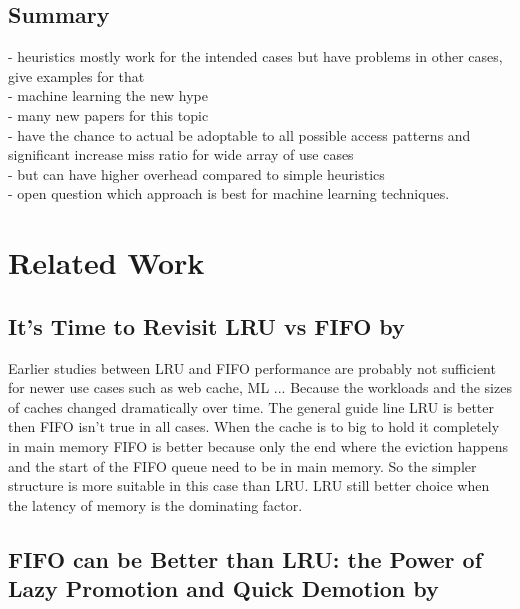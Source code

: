 \documentclass[
	12pt,
	a4paper,
	abstract,
	bibliography=totoc,
	chapterprefix,
	headings=openright,
	numbers=endperiod,
	parskip=half,
	twoside,
]{scrreprt}
\begin{document}
\section{Summary}
\label{sec:summary}

- heuristics mostly work for the intended cases but have problems in other cases, give examples for that\\
- machine learning the new hype\\
- many new papers for this topic \\
- have the chance to actual be adoptable to all possible access patterns and significant increase miss ratio for wide array of use cases \\
- but can have higher overhead compared to simple heuristics\\
- open question which approach is best for machine learning techniques.

\chapter{Related Work}
\label{cha:related work}

\section*{It's Time to Revisit LRU vs FIFO by \cite{eytan2020s}}

Earlier studies between LRU and FIFO performance are probably not sufficient for newer use cases such as web cache, ML ...
Because the workloads and the sizes of caches changed dramatically over time.
The general guide line LRU is better then FIFO isn't true in all cases.
When the cache is to big to hold it completely in main memory FIFO is better because only the end where the eviction happens and the start of the FIFO queue need to be in main memory. So the simpler structure is more suitable in this case than LRU.
LRU still better choice when the latency of memory is the dominating factor.

\section*{FIFO can be Better than LRU: the Power of Lazy Promotion and Quick Demotion by \cite{yang2023fifo}}
\end{document}
